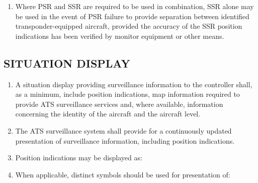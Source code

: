 \documentclass[../vATM.tex]{subfiles}
\begin{document}
\begin{enumerate}[label=\arabic{section}.\arabic{subsection}.\arabic*]
        \item Where PSR and SSR are required to be used in combination, SSR alone may be used in the event of PSR failure to provide separation between identified transponder-equipped aircraft, provided the accuracy of the SSR position indications has been verified by monitor equipment or other means.
    \end{enumerate}

    \subsection[Situation display]{SITUATION DISPLAY}

    \begin{enumerate}[label=\arabic{section}.\arabic{subsection}.\arabic*]
        \item A situation display providing surveillance information to the controller shall, as a minimum, include position indications, map information required to provide ATS surveillance services and, where available, information concerning the identity of the aircraft and the aircraft level.
        \item The ATS surveillance system shall provide for a continuously updated presentation of surveillance information, including position indications.
        \item Position indications may be displayed as:


        \item When applicable, distinct symbols should be used for presentation of:



\end{enumerate}
\end{document}
